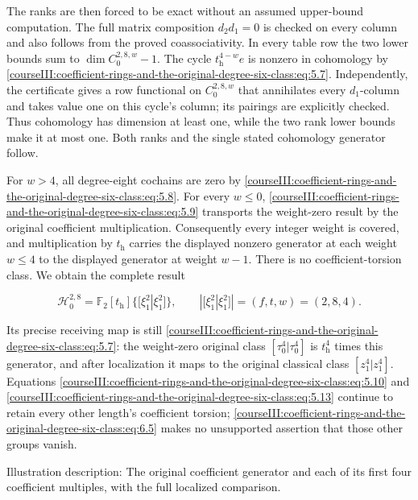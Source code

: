 The ranks are then forced to be exact without an assumed upper-bound computation. The full matrix composition \(d_2d_1=0\) is checked on every column and also follows from the proved coassociativity. In every table row the two lower bounds sum to \(\dim C_0^{2,8,w}-1\). The cycle \(t_{\mathrm h}^{4-w}e\) is nonzero in cohomology by \eqref{courseIII:coefficient-rings-and-the-original-degree-six-class:eq:5.7}. Independently, the certificate gives a row functional on \(C_0^{2,8,w}\) that annihilates every \(d_1\)-column and takes value one on this cycle's column; its pairings are explicitly checked. Thus cohomology has dimension at least one, while the two rank lower bounds make it at most one. Both ranks and the single stated cohomology generator follow.

For \(w>4\), all degree-eight cochains are zero by \eqref{courseIII:coefficient-rings-and-the-original-degree-six-class:eq:5.8}. For every \(w\leq0\), \eqref{courseIII:coefficient-rings-and-the-original-degree-six-class:eq:5.9} transports the weight-zero result by the original coefficient multiplication. Consequently every integer weight is covered, and multiplication by \(t_{\mathrm h}\) carries the displayed nonzero generator at each weight \(w\leq4\) to the displayed generator at weight \(w-1\). There is no coefficient-torsion class. We obtain the complete result

\begin{equation}
\boxed{\displaystyle
 \mathcal H_0^{2,8}
       =\mathbb F_2[t_{\mathrm h}]
                      \{[\xi_1^2|\xi_1^2]\},
 \qquad |[\xi_1^2|\xi_1^2]|=(f,t,w)=(2,8,4).}
 \label{courseIII:coefficient-rings-and-the-original-degree-six-class:eq:6.5}
\end{equation}

Its precise receiving map is still \eqref{courseIII:coefficient-rings-and-the-original-degree-six-class:eq:5.7}: the weight-zero original class
\([\tau_0^4|\tau_0^4]\) is \(t_{\mathrm h}^4\) times this generator, and after localization it maps to the original classical class \([z_1^4|z_1^4]\). Equations \eqref{courseIII:coefficient-rings-and-the-original-degree-six-class:eq:5.10} and \eqref{courseIII:coefficient-rings-and-the-original-degree-six-class:eq:5.13} continue to retain every other length's coefficient torsion; \eqref{courseIII:coefficient-rings-and-the-original-degree-six-class:eq:6.5} makes no unsupported assertion that those other groups vanish.

Illustration description: The original coefficient generator and each of its first four coefficient multiples, with the full localized comparison.

